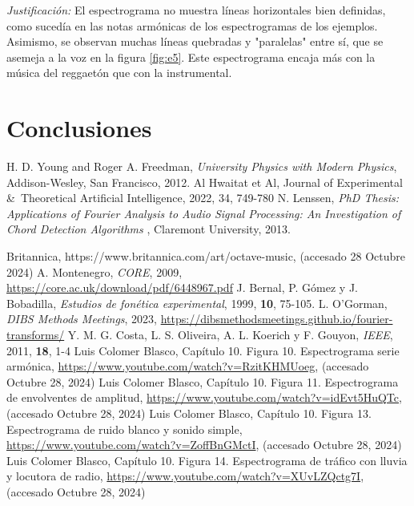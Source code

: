 \documentclass[12pt, letterpaper]{article}
\begin{document}
\textit{Justificación:}
El espectrograma no muestra líneas horizontales bien definidas, como
sucedía en las notas armónicas de los espectrogramas de los ejemplos.
Asimismo, se observan muchas líneas quebradas y "paralelas" entre sí,
que se asemeja a la voz en la figura \ref{fig:e5}. Este espectrograma encaja más
con la música del reggaetón que con la instrumental.

\section{Conclusiones}



\begin{thebibliography}{9}
  H. D. Young and Roger A. Freedman, \emph{University Physics with Modern Physics}, 
  Addison-Wesley, San Francisco, 2012. %
  Al Hwaitat et Al, Journal of Experimental \&\ Theoretical Artificial Intelligence,
  2022, 34, 749-780
  N. Lenssen, \emph{PhD Thesis: Applications of Fourier Analysis to Audio Signal Processing: An Investigation of Chord Detection Algorithms
  }, Claremont University, 2013.

  Britannica, https://www.britannica.com/art/octave-music, (accesado 28 Octubre 2024)
  A. Montenegro, \textit{CORE}, 2009, \url{https://core.ac.uk/download/pdf/6448967.pdf}
  J. Bernal, P. Gómez y J. Bobadilla, \textit{Estudios de fonética experimental}, 1999, \textbf{10}, 75-105.
  L. O'Gorman, \textit{DIBS Methods Meetings}, 2023, \url{https://dibsmethodsmeetings.github.io/fourier-transforms/}
  Y. M. G. Costa, L. S. Oliveira, A. L. Koerich y F. Gouyon, \textit{IEEE}, 2011,
  \textbf{18}, 1-4
  Luis Colomer Blasco, Capítulo 10. Figura 10. Espectrograma serie armónica,
  \url{https://www.youtube.com/watch?v=RzitKHMUoeg}, (accesado Octubre 28, 2024)
  Luis Colomer Blasco, Capítulo 10. Figura 11. Espectrograma de envolventes de amplitud,
  \url{https://www.youtube.com/watch?v=idEvt5HuQTc}, (accesado Octubre 28, 2024)
  Luis Colomer Blasco, Capítulo 10. Figura 13. Espectrograma de ruido blanco y sonido simple,
  \url{https://www.youtube.com/watch?v=ZoffBnGMctI}, (accesado Octubre 28, 2024)
  Luis Colomer Blasco, Capítulo 10. Figura 14. Espectrograma de tráfico con lluvia y locutora de radio,
  \url{https://www.youtube.com/watch?v=XUvLZQctg7I}, (accesado Octubre 28, 2024)
\end{thebibliography}
\end{document}
